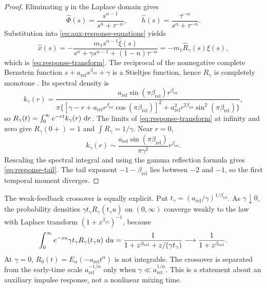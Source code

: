 \begin{proof}
Eliminating \(y\) in the Laplace domain gives
\[
\widehat\Phi(s)=\frac{s^{\alpha-1}}{s^\alpha+\tau^{-\alpha}},
\qquad
\widehat h(s)=\frac{\tau^{-\alpha}}{s^\alpha+\tau^{-\alpha}}.
\]
Substitution into \eqref{eq:aux-response-equations} yields
\[
\widehat x(s)=-\frac{m_1s^{\alpha-1}\widehat\xi(s)}
{s^\alpha+\gamma s^{\alpha-1}+(1-n)\tau^{-\alpha}}
=-m_1\widehat R_\gamma(s)\widehat\xi(s),
\]
which is \eqref{eq:response-transform}. The reciprocal of the nonnegative complete Bernstein function \(s+a_{\mathrm{rel}} s^{\beta_{\mathrm{rel}}}+\gamma\) is a Stieltjes function, hence \(R_\gamma\) is completely monotone
\citep[Section~2.1]{MeerschaertToaldo2019}. Its spectral density is
\[
k_\gamma(r)=
\frac{a_{\mathrm{rel}}\sin(\pi\beta_{\mathrm{rel}})r^{\beta_{\mathrm{rel}}}}
{\pi\{[\gamma-r+a_{\mathrm{rel}} r^{\beta_{\mathrm{rel}}}\cos(\pi\beta_{\mathrm{rel}})]^2+
a_{\mathrm{rel}}^2r^{2\beta_{\mathrm{rel}}}\sin^2(\pi\beta_{\mathrm{rel}})\}},
\]
so \(R_\gamma(t)=\int_0^\infty e^{-rt}k_\gamma(r)\,\mathop{}\!\mathrm{d} r\). The limits of \eqref{eq:response-transform} at infinity and zero give \(R_\gamma(0+)=1\) and \(\int R_\gamma=1/\gamma\). Near \(r=0\),
\[
k_\gamma(r)\sim
\frac{a_{\mathrm{rel}}\sin(\pi\beta_{\mathrm{rel}})}{\pi\gamma^2}r^{\beta_{\mathrm{rel}}}.
\]
Rescaling the spectral integral and using the gamma reflection formula gives \eqref{eq:response-tail}. The tail exponent \(-1-\beta_{\mathrm{rel}}\) lies between \(-2\) and \(-1\), so the first temporal moment diverges.
\end{proof}

The weak-feedback crossover is equally explicit. Put \(t_\gamma=(a_{\mathrm{rel}}/\gamma)^{1/\beta_{\mathrm{rel}}}\). As \(\gamma\downarrow0\), the probability densities \(\gamma t_\gamma R_\gamma(t_\gamma u)\) on \((0,\infty)\) converge weakly to the law with Laplace transform \((1+z^{\beta_{\mathrm{rel}}})^{-1}\), because
\[
\int_0^\infty e^{-zu}\gamma t_\gamma R_\gamma(t_\gamma u)\,\mathop{}\!\mathrm{d} u
=\frac{1}{1+z^{\beta_{\mathrm{rel}}}+z/(\gamma t_\gamma)}
\longrightarrow\frac{1}{1+z^{\beta_{\mathrm{rel}}}}.
\]
At \(\gamma=0\), \(R_0(t)=E_\alpha(-a_{\mathrm{rel}}t^\alpha)\) is not integrable. The crossover is separated from the early-time scale \(a_{\mathrm{rel}}^{-1/\alpha}\) only when \(\gamma\ll a_{\mathrm{rel}}^{1/\alpha}\). This is a statement about an auxiliary impulse response, not a nonlinear mixing time.

